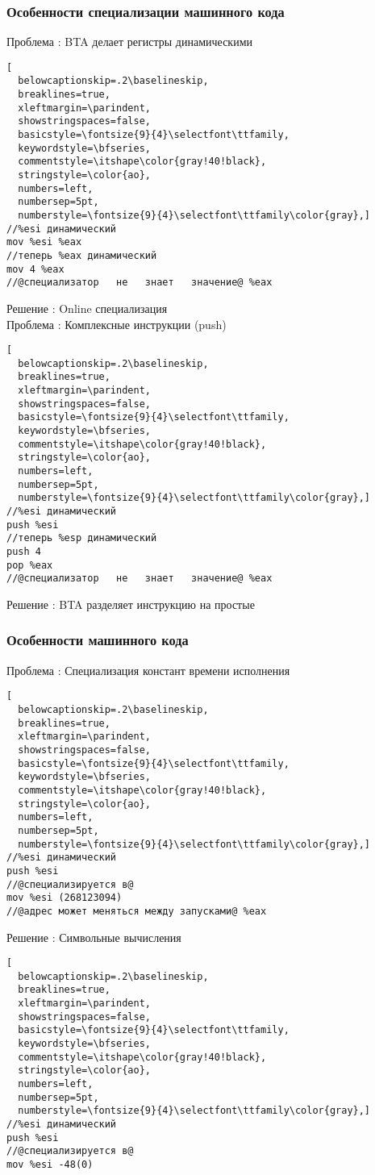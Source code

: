 \documentclass{beamer}
\begin{document}
\lstset{language=C}
\begin{frame}[fragile]\frametitle{Особенности специализации машинного кода}
Проблема : BTA делает регистры динамическими \\
\begin{lstlisting}[
  belowcaptionskip=.2\baselineskip,
  breaklines=true,
  xleftmargin=\parindent,
  showstringspaces=false,
  basicstyle=\fontsize{9}{4}\selectfont\ttfamily,
  keywordstyle=\bfseries,
  commentstyle=\itshape\color{gray!40!black},
  stringstyle=\color{ao},
  numbers=left,
  numbersep=5pt,
  numberstyle=\fontsize{9}{4}\selectfont\ttfamily\color{gray},]
//%esi динамический
mov %esi %eax
//теперь %eax динамический
mov 4 %eax
//@специализатор   не   знает   значение@ %eax
\end{lstlisting}
Решение : Online специализация \\
\vfill
Проблема : Комплексные инструкции (push)\\
\begin{lstlisting}[
  belowcaptionskip=.2\baselineskip,
  breaklines=true,
  xleftmargin=\parindent,
  showstringspaces=false,
  basicstyle=\fontsize{9}{4}\selectfont\ttfamily,
  keywordstyle=\bfseries,
  commentstyle=\itshape\color{gray!40!black},
  stringstyle=\color{ao},
  numbers=left,
  numbersep=5pt,
  numberstyle=\fontsize{9}{4}\selectfont\ttfamily\color{gray},]
//%esi динамический
push %esi
//теперь %esp динамический
push 4
pop %eax
//@специализатор   не   знает   значение@ %eax
\end{lstlisting}
Решение : BTA разделяет инструкцию на простые\\
\end{frame}


\lstset{language=C}
\begin{frame}[fragile]\frametitle{Особенности машинного кода}
Проблема : Специализация констант времени исполнения \\
\begin{lstlisting}[
  belowcaptionskip=.2\baselineskip,
  breaklines=true,
  xleftmargin=\parindent,
  showstringspaces=false,
  basicstyle=\fontsize{9}{4}\selectfont\ttfamily,
  keywordstyle=\bfseries,
  commentstyle=\itshape\color{gray!40!black},
  stringstyle=\color{ao},
  numbers=left,
  numbersep=5pt,
  numberstyle=\fontsize{9}{4}\selectfont\ttfamily\color{gray},]
//%esi динамический
push %esi
//@специализируется в@
mov %esi (268123094)
//@адрес может меняться между запусками@ %eax
\end{lstlisting}
\vfill
Решение : Символьные вычисления
\begin{lstlisting}[
  belowcaptionskip=.2\baselineskip,
  breaklines=true,
  xleftmargin=\parindent,
  showstringspaces=false,
  basicstyle=\fontsize{9}{4}\selectfont\ttfamily,
  keywordstyle=\bfseries,
  commentstyle=\itshape\color{gray!40!black},
  stringstyle=\color{ao},
  numbers=left,
  numbersep=5pt,
  numberstyle=\fontsize{9}{4}\selectfont\ttfamily\color{gray},]
//%esi динамический
push %esi
//@специализируется в@
mov %esi -48(0)
\end{lstlisting}
\end{frame}
\end{document}
